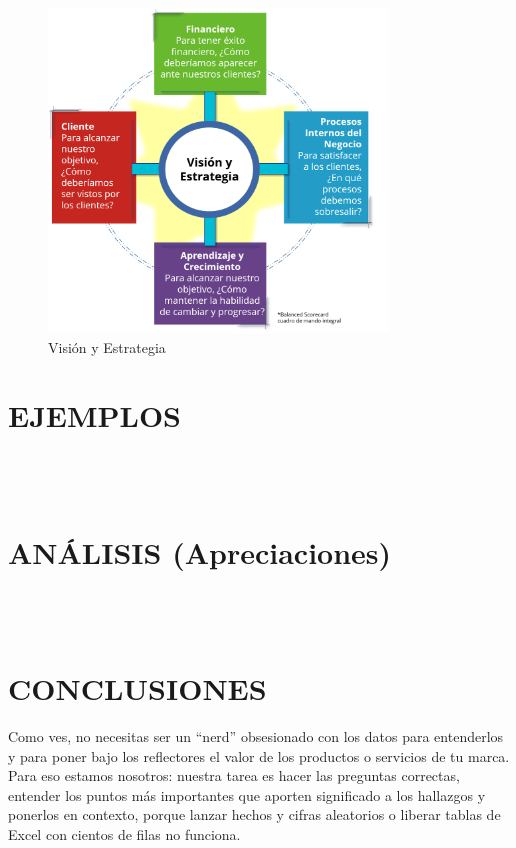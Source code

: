 \documentclass[a4paper,12pt,twocolumn]{article}
\begin{document}
\\
\textbf{}
\\
\\
\begin{figure}[h!]
\centering
\includegraphics[width=9cm]{./Imagenes/img4}
\caption{\label{fig:01}Visión y Estrategia}
\end{figure}

\section{EJEMPLOS}
\\
\textbf{}
\\

\section{ANÁLISIS (Apreciaciones)}

\\
\textbf{}
\\

\section{CONCLUSIONES} 
\item Como ves, no necesitas ser un “nerd” obsesionado con los datos para entenderlos y para poner bajo los reflectores el valor de los productos o servicios de tu marca. Para eso estamos nosotros: nuestra tarea es hacer las preguntas correctas, entender los puntos más importantes que aporten significado a los hallazgos y ponerlos en contexto, porque lanzar hechos y cifras aleatorios o liberar tablas de Excel con cientos de filas no funciona. 
\end{document}
